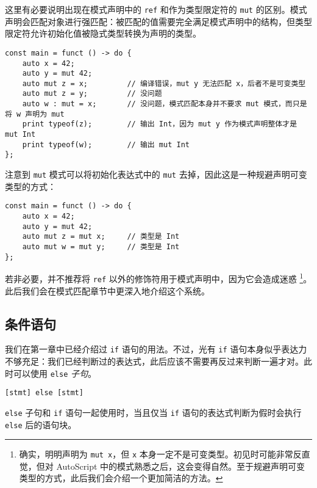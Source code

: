 这里有必要说明出现在模式声明中的 \lstinline!ref! 和作为类型限定符的 \lstinline!mut! 的区别。模式声明会匹配对象进行强匹配：被匹配的值需要完全满足模式声明中的结构，但类型限定符允许初始化值被隐式类型转换为声明的类型。

\begin{lstlisting}
const main = funct () -> do {
    auto x = 42;
    auto y = mut 42;
    auto mut z = x;         // 编译错误，mut y 无法匹配 x，后者不是可变类型
    auto mut z = y;         // 没问题
    auto w : mut = x;		// 没问题，模式匹配本身并不要求 mut 模式，而只是将 w 声明为 mut
    print typeof(z);        // 输出 Int，因为 mut y 作为模式声明整体才是 mut Int
    print typeof(w);		// 输出 mut Int
};
\end{lstlisting}

注意到 \lstinline!mut! 模式可以将初始化表达式中的 \lstinline!mut! 去掉，因此这是一种规避声明可变类型的方式：

\begin{minipage}[c]{0.95\textwidth}
\vspace{1.0em}
\begin{lstlisting}
const main = funct () -> do {
    auto x = 42;
    auto y = mut 42;
    auto mut z = mut x;		// 类型是 Int
    auto mut w = mut y;		// 类型是 Int
};
\end{lstlisting}
\end{minipage}

若非必要，并不推荐将 \lstinline!ref! 以外的修饰符用于模式声明中，因为它会造成迷惑 \footnote{确实，明明声明为 \lstinline!mut x!，但 \lstinline!x! 本身一定不是可变类型。初见时可能非常反直觉，但对 AutoScript 中的模式熟悉之后，这会变得自然。至于规避声明可变类型的方式，此后我们会介绍一个更加简洁的方法。}。此后我们会在模式匹配章节中更深入地介绍这个系统。

\subsection{条件语句}

我们在第一章中已经介绍过 \lstinline!if! 语句的用法。不过，光有 \lstinline!if! 语句本身似乎表达力不够充足：我们已经判断过的表达式，此后应该不需要再反过来判断一遍才对。此时可以使用 \lstinline!else! \emph{子句}。

\begin{grammar}
    \lstinline![stmt] else [stmt]!
\end{grammar}

\lstinline!else! 子句和 \lstinline!if! 语句一起使用时，当且仅当 \lstinline!if! 语句的表达式判断为假时会执行 \lstinline!else! 后的语句块。

